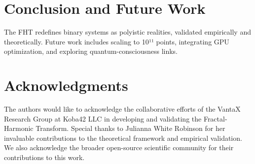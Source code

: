 \documentclass[12pt]{article}
\begin{document}
\section{Conclusion and Future Work}
The FHT redefines binary systems as polyistic realities, validated empirically and theoretically. Future work includes scaling to 10¹¹ points, integrating GPU optimization, and exploring quantum-consciousness links.

\section{Acknowledgments}
The authors would like to acknowledge the collaborative efforts of the VantaX Research Group at Koba42 LLC in developing and validating the Fractal-Harmonic Transform. Special thanks to Julianna White Robinson for her invaluable contributions to the theoretical framework and empirical validation. We also acknowledge the broader open-source scientific community for their contributions to this work.



\end{document}
